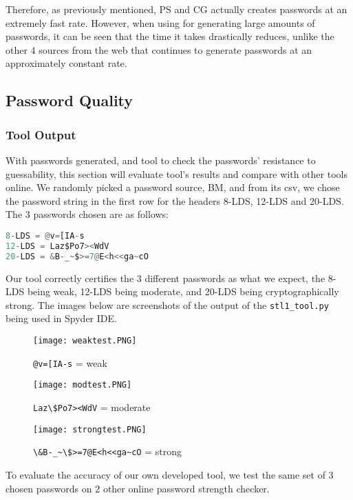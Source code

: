 \documentclass[letterpaper,twocolumn,10pt]{article}
\begin{document}
Therefore, as previously mentioned, PS and CG actually creates passwords at an extremely fast rate. However, when using for generating large amounts of passwords, it can be seen that the time it takes drastically reduces, unlike the other 4 sources from the web that continues to generate passwords at an approximately constant rate.

\subsection{Password Quality}

\subsubsection{Tool Output}

With passwords generated, and tool to check the passwords' resistance to guessability, this section will evaluate tool's results and compare with other tools online. We randomly picked a password source, BM, and from its csv, we chose the password string in the first row for the headers 8-LDS, 12-LDS and 20-LDS. The 3 passwords chosen are as follows:

\begin{lstlisting}[language=python, frame=none]
8-LDS = @v=[IA-s
12-LDS = Laz$Po7><WdV
20-LDS = &B-_~$>=7@E<h<<ga~cO
\end{lstlisting}

Our tool correctly certifies the 3 different passwords as what we expect, the 8-LDS being weak, 12-LDS being moderate, and 20-LDS being cryptographically strong. The images below are screenshots of the output of the \lstinline{stl1_tool.py} being used in Spyder IDE. 

\begin{figure}[H]
    \centering
    \texttt{[image: weaktest.PNG]}
    \caption{\lstinline{@v=[IA-s} = weak}
\end{figure}

\begin{figure}[H]
    \centering
    \texttt{[image: modtest.PNG]}
    \caption{\lstinline{Laz\$Po7><WdV} = moderate}
\end{figure}

\begin{figure}[H]
    \centering
    \texttt{[image: strongtest.PNG]}
    \caption{\lstinline{\&B-_~\$>=7@E<h<<ga~cO} = strong}
\end{figure}

To evaluate the accuracy of our own developed tool, we test the same set of 3 chosen passwords on 2 other online password strength checker.
\end{document}
